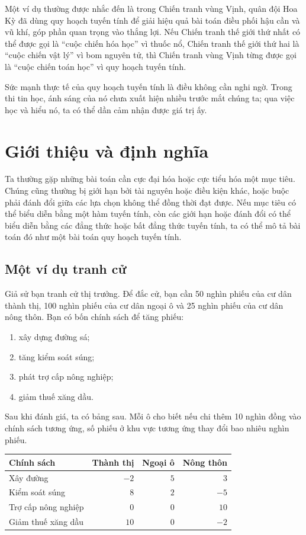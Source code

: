 \documentclass[11pt]{article}
\begin{document}
Một ví dụ thường được nhắc đến là trong Chiến tranh vùng Vịnh, quân đội Hoa
Kỳ đã dùng quy hoạch tuyến tính để giải hiệu quả bài toán điều phối hậu cần
và vũ khí, góp phần quan trọng vào thắng lợi. Nếu Chiến tranh thế giới thứ
nhất có thể được gọi là ``cuộc chiến hóa học'' vì thuốc nổ, Chiến tranh thế
giới thứ hai là ``cuộc chiến vật lý'' vì bom nguyên tử, thì Chiến tranh vùng
Vịnh từng được gọi là ``cuộc chiến toán học'' vì quy hoạch tuyến tính.

Sức mạnh thực tế của quy hoạch tuyến tính là điều không cần nghi ngờ. Trong
thi tin học, ánh sáng của nó chưa xuất hiện nhiều trước mắt chúng ta; qua
việc học và hiểu nó, ta có thể dần cảm nhận được giá trị ấy.

\section{Giới thiệu và định nghĩa}

Ta thường gặp những bài toán cần cực đại hóa hoặc cực tiểu hóa một mục tiêu.
Chúng cũng thường bị giới hạn bởi tài nguyên hoặc điều kiện khác, hoặc buộc
phải đánh đổi giữa các lựa chọn không thể đồng thời đạt được. Nếu mục tiêu
có thể biểu diễn bằng một hàm tuyến tính, còn các giới hạn hoặc đánh đổi có
thể biểu diễn bằng các đẳng thức hoặc bất đẳng thức tuyến tính, ta có thể mô
tả bài toán đó như một bài toán quy hoạch tuyến tính.

\subsection*{Một ví dụ tranh cử}

Giả sử bạn tranh cử thị trưởng. Để đắc cử, bạn cần 50 nghìn phiếu của cư dân
thành thị, 100 nghìn phiếu của cư dân ngoại ô và 25 nghìn phiếu của cư dân
nông thôn. Bạn có bốn chính sách để tăng phiếu:
\begin{enumerate}
  \item xây dựng đường sá;
  \item tăng kiểm soát súng;
  \item phát trợ cấp nông nghiệp;
  \item giảm thuế xăng dầu.
\end{enumerate}

Sau khi đánh giá, ta có bảng sau. Mỗi ô cho biết nếu chi thêm 10 nghìn đồng
vào chính sách tương ứng, số phiếu ở khu vực tương ứng thay đổi bao nhiêu
nghìn phiếu.

\begin{center}
\begin{tabular}{lrrr}
\hline
Chính sách & Thành thị & Ngoại ô & Nông thôn\\
\hline
Xây đường & $-2$ & $5$ & $3$\\
Kiểm soát súng & $8$ & $2$ & $-5$\\
Trợ cấp nông nghiệp & $0$ & $0$ & $10$\\
Giảm thuế xăng dầu & $10$ & $0$ & $-2$\\
\hline
\end{tabular}
\end{center}
\end{document}
